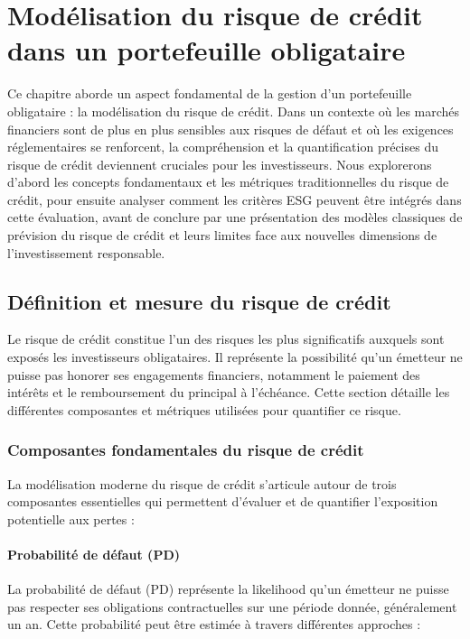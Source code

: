 \chapter{Modélisation du risque de crédit dans un portefeuille obligataire}

Ce chapitre aborde un aspect fondamental de la gestion d'un portefeuille obligataire : la modélisation du risque de crédit. Dans un contexte où les marchés financiers sont de plus en plus sensibles aux risques de défaut et où les exigences réglementaires se renforcent, la compréhension et la quantification précises du risque de crédit deviennent cruciales pour les investisseurs. Nous explorerons d'abord les concepts fondamentaux et les métriques traditionnelles du risque de crédit, pour ensuite analyser comment les critères ESG peuvent être intégrés dans cette évaluation, avant de conclure par une présentation des modèles classiques de prévision du risque de crédit et leurs limites face aux nouvelles dimensions de l'investissement responsable.

\section{Définition et mesure du risque de crédit}

Le risque de crédit constitue l'un des risques les plus significatifs auxquels sont exposés les investisseurs obligataires. Il représente la possibilité qu'un émetteur ne puisse pas honorer ses engagements financiers, notamment le paiement des intérêts et le remboursement du principal à l'échéance. Cette section détaille les différentes composantes et métriques utilisées pour quantifier ce risque.

\subsection{Composantes fondamentales du risque de crédit}

La modélisation moderne du risque de crédit s'articule autour de trois composantes essentielles qui permettent d'évaluer et de quantifier l'exposition potentielle aux pertes :

\subsubsection{Probabilité de défaut (PD)}

La probabilité de défaut (PD) représente la likelihood qu'un émetteur ne puisse pas respecter ses obligations contractuelles sur une période donnée, généralement un an. Cette probabilité peut être estimée à travers différentes approches :

